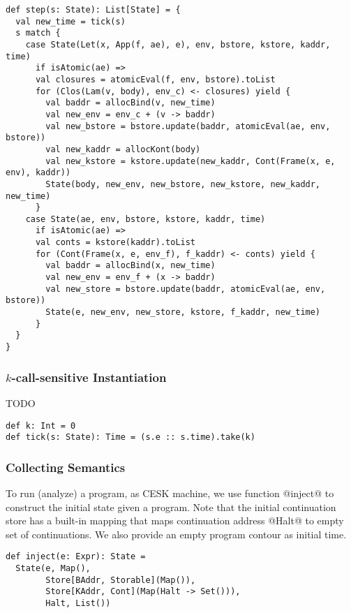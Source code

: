 \documentclass[acmsmall,review,anonymous]{acmart}\settopmatter{printfolios=true,printccs=false,printacmref=false}
\begin{document}
\begin{lstlisting}
def step(s: State): List[State] = {
  val new_time = tick(s)
  s match {
    case State(Let(x, App(f, ae), e), env, bstore, kstore, kaddr, time) 
      if isAtomic(ae) =>
      val closures = atomicEval(f, env, bstore).toList
      for (Clos(Lam(v, body), env_c) <- closures) yield {
        val baddr = allocBind(v, new_time)
        val new_env = env_c + (v -> baddr)
        val new_bstore = bstore.update(baddr, atomicEval(ae, env, bstore))
        val new_kaddr = allocKont(body)
        val new_kstore = kstore.update(new_kaddr, Cont(Frame(x, e, env), kaddr))
        State(body, new_env, new_bstore, new_kstore, new_kaddr, new_time)
      }
    case State(ae, env, bstore, kstore, kaddr, time) 
      if isAtomic(ae) =>
      val conts = kstore(kaddr).toList
      for (Cont(Frame(x, e, env_f), f_kaddr) <- conts) yield {
        val baddr = allocBind(x, new_time)
        val new_env = env_f + (x -> baddr)
        val new_store = bstore.update(baddr, atomicEval(ae, env, bstore))
        State(e, new_env, new_store, kstore, f_kaddr, new_time)
      }
  }
}
\end{lstlisting}

\subsubsection{$k$-call-sensitive Instantiation} \label{kcfainst}

TODO

\begin{lstlisting}
def k: Int = 0
def tick(s: State): Time = (s.e :: s.time).take(k)
\end{lstlisting}

\subsubsection{Collecting Semantics}

To run (analyze) a program, as CESK machine, we use function @inject@ to construct
the initial state given a program. 
Note that the initial continuation store has a built-in mapping that maps continuation address
@Halt@ to empty set of continuations.
We also provide an empty program contour as initial time.
\begin{lstlisting}
def inject(e: Expr): State = 
  State(e, Map(), 
        Store[BAddr, Storable](Map()), 
        Store[KAddr, Cont](Map(Halt -> Set())), 
        Halt, List())
\end{lstlisting}
\end{document}
